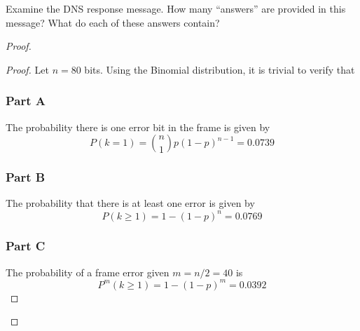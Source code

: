 \documentclass[../../main.tex]{subfiles}
\begin{document}
\begin{wts}
Examine the DNS response message. How many “answers” are provided in this message? What do each of these answers contain?
\end{wts}
\begin{proof}
\begin{proof}
Let $n = 80$ bits. Using the Binomial distribution, it is trivial to verify that
\subsubsection*{Part A}
The probability there is one error bit in the frame is given by 
\[
P(k=1) = \binom{n}{1}p(1-p)^{n-1} = 0.0739
\]
\subsubsection*{Part B}
The probability that there is at least one error is given by
\[
P(k\geq 1) = 1 - (1-p)^n = 0.0769
\]

\subsubsection*{Part C}
The probability of a frame error given $m=n/2 = 40$ is
\[
P^m(k\geq 1) = 1-(1-p)^m = 0.0392
\]

\end{proof}

\end{proof}
\end{document}
